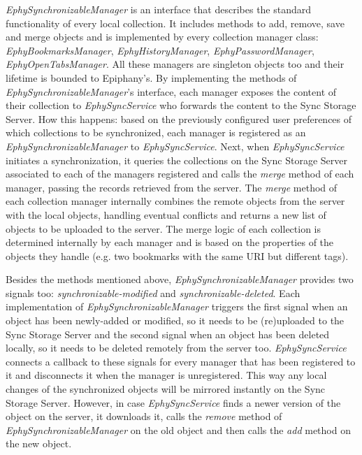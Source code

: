 \textit{EphySynchronizableManager} is an interface that describes the standard functionality of every local collection. It includes methods to add, remove, save and merge objects and is implemented by every collection manager class: \textit{EphyBookmarksManager}, \textit{EphyHistoryManager}, \textit{EphyPasswordManager}, \textit{EphyOpenTabsManager}. All these managers are singleton objects too and their lifetime is bounded to Epiphany's. By implementing the methods of \textit{EphySynchronizableManager}'s interface, each manager exposes the content of their collection to \textit{EphySyncService} who forwards the content to the Sync Storage Server. How this happens: based on the previously configured user preferences of which collections to be synchronized, each manager is registered as an \textit{EphySynchronizableManager} to \textit{EphySyncService}. Next, when \textit{EphySyncService} initiates a synchronization, it queries the collections on the Sync Storage Server associated to each of the managers registered and calls the \textit{merge} method of each manager, passing the records retrieved from the server. The \textit{merge} method of each collection manager internally combines the remote objects from the server with the local objects, handling eventual conflicts and returns a new list of objects to be uploaded to the server. The merge logic of each collection is determined internally by each manager and is based on the properties of the objects they handle (e.g. two bookmarks with the same URI but different tags).

Besides the methods mentioned above, \textit{EphySynchronizableManager} provides two signals too: \textit{synchronizable-modified} and \textit{synchronizable-deleted}. Each implementation of \textit{EphySynchronizableManager} triggers the first signal when an object has been newly-added or modified, so it needs to be (re)uploaded to the Sync Storage Server and the second signal when an object has been deleted locally, so it needs to be deleted remotely from the server too. \textit{EphySyncService} connects a callback to these signals for every manager that has been registered to it and disconnects it when the manager is unregistered. This way any local changes of the synchronized objects will be mirrored instantly on the Sync Storage Server. However, in case \textit{EphySyncService} finds a newer version of the object on the server, it downloads it, calls the \textit{remove} method of \textit{EphySynchronizableManager} on the old object and then calls the \textit{add} method on the new object.

